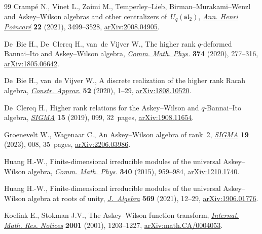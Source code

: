 \documentclass[10pt,a4paper]{amsart}
\numberwithin{equation}{section}
\begin{document}
\begin{thebibliography}{99}
Cramp\'e N., Vinet L., Zaimi M., Temperley--{L}ieb,
 {B}irman--{M}urakami--{W}enzl and {A}skey--{W}ilson algebras and other
 centralizers of~{$U_q(\mathfrak{sl}_2)$}, \href{https://doi.org/10.1007/s00023-021-01064-x}{\textit{Ann. Henri Poincar\'e}}
 \textbf{22} (2021), 3499--3528, \href{https://arxiv.org/abs/2008.04905}{arXiv:2008.04905}.

De~Bie H., De~Clercq H., van~de Vijver W., The higher rank {$q$}-deformed
 {B}annai--{I}to and {A}skey--{W}ilson algebra, \href{https://doi.org/10.1007/s00220-019-03562-w}{\textit{Comm. Math. Phys.}}
 \textbf{374} (2020), 277--316, \href{https://arxiv.org/abs/1805.06642}{arXiv:1805.06642}.

De~Bie H., van~de Vijver W., A discrete realization of the higher rank {R}acah
 algebra, \href{https://doi.org/10.1007/s00365-019-09475-0}{\textit{Constr. Approx.}} \textbf{52} (2020), 1--29,
 \href{https://arxiv.org/abs/1808.10520}{arXiv:1808.10520}.

De~Clercq H., Higher rank relations for the {A}skey--{W}ilson and
 {$q$}-{B}annai--{I}to algebra, \href{https://doi.org/10.3842/SIGMA.2019.099}{\textit{SIGMA}} \textbf{15} (2019), 099,
 32~pages, \href{https://arxiv.org/abs/1908.11654}{arXiv:1908.11654}.

Groenevelt W., Wagenaar C., An {A}skey--{W}ilson algebra of rank~2,
 \href{https://doi.org/10.3842/SIGMA.2023.008}{\textit{SIGMA}} \textbf{19} (2023), 008, 35~pages, \href{https://arxiv.org/abs/2206.03986}{arXiv:2206.03986}.

Huang H.-W., Finite-dimensional irreducible modules of the universal
 {A}skey--{W}ilson algebra, \href{https://doi.org/10.1007/s00220-015-2467-9}{\textit{Comm. Math. Phys.}} \textbf{340} (2015),
 959--984, \href{https://arxiv.org/abs/1210.1740}{arXiv:1210.1740}.

Huang H.-W., Finite-dimensional irreducible modules of the universal
 {A}skey--{W}ilson algebra at roots of unity, \href{https://doi.org/10.1016/j.jalgebra.2020.11.012}{\textit{J.~Algebra}} \textbf{569}
 (2021), 12--29, \href{https://arxiv.org/abs/1906.01776}{arXiv:1906.01776}.

Koelink E., Stokman J.V., The {A}skey--{W}ilson function transform,
 \href{https://doi.org/10.1155/S1073792801000575}{\textit{Internat. Math. Res. Notices}} \textbf{2001} (2001), 1203--1227,
 \href{https://arxiv.org/abs/math.CA/0004053}{arXiv:math.CA/0004053}.


\end{thebibliography}
\end{document}
